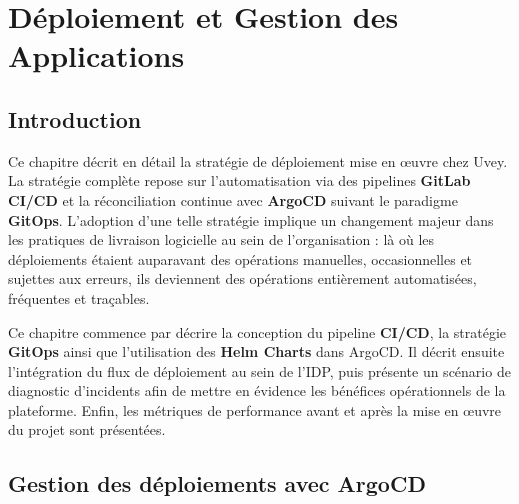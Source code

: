 \chapter{Déploiement et Gestion des Applications}
\label{chap:deploiement}

\section*{Introduction}

\noindent Ce chapitre décrit en détail la stratégie de déploiement mise en œuvre chez Uvey.
La stratégie complète repose sur l'automatisation via des pipelines \textbf{GitLab \ac{CI/CD}}
et la réconciliation continue avec \textbf{ArgoCD} suivant le paradigme \textbf{GitOps}.
L'adoption d'une telle stratégie implique un changement majeur dans les pratiques de
livraison logicielle au sein de l'organisation : là où les déploiements étaient auparavant
des opérations manuelles, occasionnelles et sujettes aux erreurs, ils deviennent des
opérations entièrement automatisées, fréquentes et traçables.

\medskip

\noindent Ce chapitre commence par décrire la conception du pipeline \textbf{\ac{CI/CD}}, la
stratégie \textbf{GitOps} ainsi que l'utilisation des \textbf{Helm Charts} dans ArgoCD.
Il décrit ensuite l'intégration du flux de déploiement au sein de l'\ac{IDP}, puis
présente un scénario de diagnostic d'incidents afin de mettre en évidence les bénéfices
opérationnels de la plateforme. Enfin, les métriques de performance avant et après la
mise en œuvre du projet sont présentées.

\section{Gestion des déploiements avec ArgoCD}
\label{sec:argocd}

